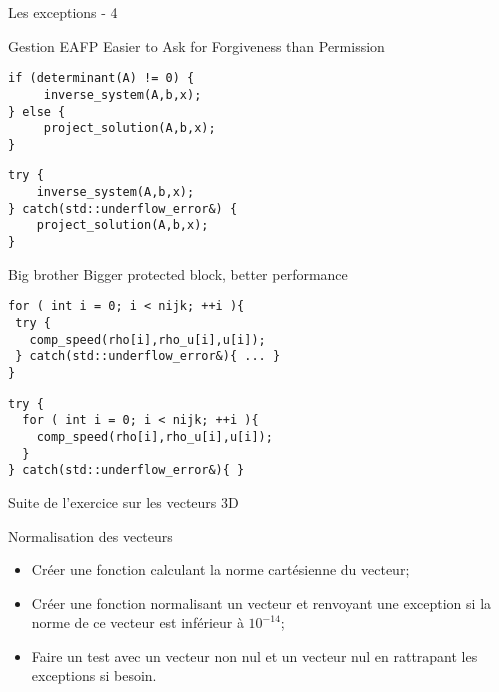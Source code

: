 \documentclass[handout,10pt]{beamer}
\begin{document}
\begin{frame}[fragile]{Les exceptions - 4}
\tiny
\begin{block}{Gestion EAFP}
Easier to Ask for Forgiveness than Permission
\begin{minipage}{0.49\textwidth}
\begin{lstlisting}
if (determinant(A) != 0) {
     inverse_system(A,b,x);
} else {
     project_solution(A,b,x);
}
\end{lstlisting}
\end{minipage}
\begin{minipage}{0.49\textwidth}
\begin{lstlisting}
try {
    inverse_system(A,b,x);
} catch(std::underflow_error&) {
    project_solution(A,b,x);
}
\end{lstlisting}
\end{minipage}
\end{block}

\begin{block}{Big brother}
Bigger protected block, better performance
\begin{minipage}{0.49\textwidth}
\begin{lstlisting}
for ( int i = 0; i < nijk; ++i ){
 try {
   comp_speed(rho[i],rho_u[i],u[i]);
 } catch(std::underflow_error&){ ... }
}
\end{lstlisting}
\end{minipage}
\begin{minipage}{0.49\textwidth}
\begin{lstlisting}
try {
  for ( int i = 0; i < nijk; ++i ){ 
    comp_speed(rho[i],rho_u[i],u[i]);
  }
} catch(std::underflow_error&){ }
\end{lstlisting}
\end{minipage}
\end{block} 
\end{frame}

\begin{frame}[fragile]{Suite de l'exercice sur les vecteurs 3D}
\small
\begin{block}{Normalisation des vecteurs}
\begin{itemize}
\item Créer une fonction calculant la norme cartésienne du vecteur;
\item Créer une fonction normalisant un vecteur et renvoyant une exception si la norme
      de ce vecteur est inférieur à $10^{-14}$;
\item Faire un test avec un vecteur non nul et un vecteur nul en rattrapant les exceptions si besoin.
\end{itemize}
\end{block}
\end{frame}
\end{document}
